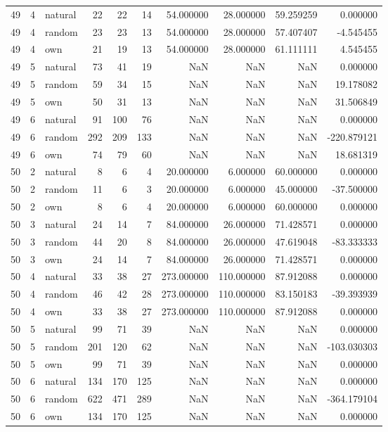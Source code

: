 \begin{table}[htbp]
\begin{tabular}{rrlrrrrrrr}
49 & 4 & natural & 22 & 22 & 14 & 54.000000 & 28.000000 & 59.259259 & 0.000000 \\
49 & 4 & random & 23 & 23 & 13 & 54.000000 & 28.000000 & 57.407407 & -4.545455 \\
49 & 4 & own & 21 & 19 & 13 & 54.000000 & 28.000000 & 61.111111 & 4.545455 \\
49 & 5 & natural & 73 & 41 & 19 & NaN & NaN & NaN & 0.000000 \\
49 & 5 & random & 59 & 34 & 15 & NaN & NaN & NaN & 19.178082 \\
49 & 5 & own & 50 & 31 & 13 & NaN & NaN & NaN & 31.506849 \\
49 & 6 & natural & 91 & 100 & 76 & NaN & NaN & NaN & 0.000000 \\
49 & 6 & random & 292 & 209 & 133 & NaN & NaN & NaN & -220.879121 \\
49 & 6 & own & 74 & 79 & 60 & NaN & NaN & NaN & 18.681319 \\
50 & 2 & natural & 8 & 6 & 4 & 20.000000 & 6.000000 & 60.000000 & 0.000000 \\
50 & 2 & random & 11 & 6 & 3 & 20.000000 & 6.000000 & 45.000000 & -37.500000 \\
50 & 2 & own & 8 & 6 & 4 & 20.000000 & 6.000000 & 60.000000 & 0.000000 \\
50 & 3 & natural & 24 & 14 & 7 & 84.000000 & 26.000000 & 71.428571 & 0.000000 \\
50 & 3 & random & 44 & 20 & 8 & 84.000000 & 26.000000 & 47.619048 & -83.333333 \\
50 & 3 & own & 24 & 14 & 7 & 84.000000 & 26.000000 & 71.428571 & 0.000000 \\
50 & 4 & natural & 33 & 38 & 27 & 273.000000 & 110.000000 & 87.912088 & 0.000000 \\
50 & 4 & random & 46 & 42 & 28 & 273.000000 & 110.000000 & 83.150183 & -39.393939 \\
50 & 4 & own & 33 & 38 & 27 & 273.000000 & 110.000000 & 87.912088 & 0.000000 \\
50 & 5 & natural & 99 & 71 & 39 & NaN & NaN & NaN & 0.000000 \\
50 & 5 & random & 201 & 120 & 62 & NaN & NaN & NaN & -103.030303 \\
50 & 5 & own & 99 & 71 & 39 & NaN & NaN & NaN & 0.000000 \\
50 & 6 & natural & 134 & 170 & 125 & NaN & NaN & NaN & 0.000000 \\
50 & 6 & random & 622 & 471 & 289 & NaN & NaN & NaN & -364.179104 \\
50 & 6 & own & 134 & 170 & 125 & NaN & NaN & NaN & 0.000000 \\

\end{tabular}
\end{table}
